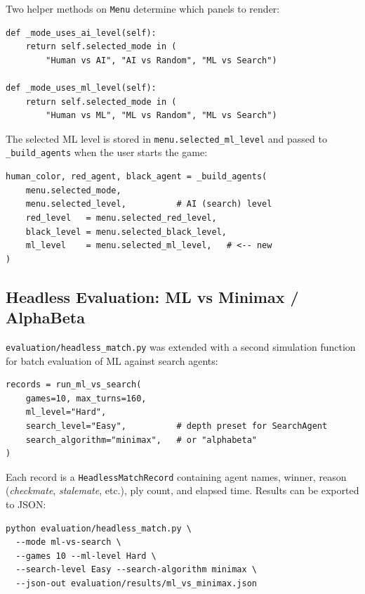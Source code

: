 Two helper methods on \texttt{Menu} determine which panels to render:

\begin{lstlisting}[caption={Panel selection logic in \texttt{Menu}}]
def _mode_uses_ai_level(self):
    return self.selected_mode in (
        "Human vs AI", "AI vs Random", "ML vs Search")

def _mode_uses_ml_level(self):
    return self.selected_mode in (
        "Human vs ML", "ML vs Random", "ML vs Search")
\end{lstlisting}

The selected ML level is stored in \texttt{menu.selected\_ml\_level}
and passed to \texttt{\_build\_agents} when the user starts the game:

\begin{lstlisting}[caption={Passing ML level from menu to agent construction}]
human_color, red_agent, black_agent = _build_agents(
    menu.selected_mode,
    menu.selected_level,          # AI (search) level
    red_level   = menu.selected_red_level,
    black_level = menu.selected_black_level,
    ml_level    = menu.selected_ml_level,   # <-- new
)
\end{lstlisting}

\subsection{Headless Evaluation: ML vs Minimax / AlphaBeta}
\label{sec:headless-eval}

\texttt{evaluation/headless\_match.py} was extended with a second
simulation function for batch evaluation of ML against search agents:

\begin{lstlisting}[caption={Headless evaluation API}]
records = run_ml_vs_search(
    games=10, max_turns=160,
    ml_level="Hard",
    search_level="Easy",          # depth preset for SearchAgent
    search_algorithm="minimax",   # or "alphabeta"
)
\end{lstlisting}

Each record is a \texttt{HeadlessMatchRecord} containing agent names,
winner, reason (\textit{checkmate}, \textit{stalemate}, etc.),
ply count, and elapsed time.  Results can be exported to JSON:

\begin{verbatim}
python evaluation/headless_match.py \
  --mode ml-vs-search \
  --games 10 --ml-level Hard \
  --search-level Easy --search-algorithm minimax \
  --json-out evaluation/results/ml_vs_minimax.json
\end{verbatim}


